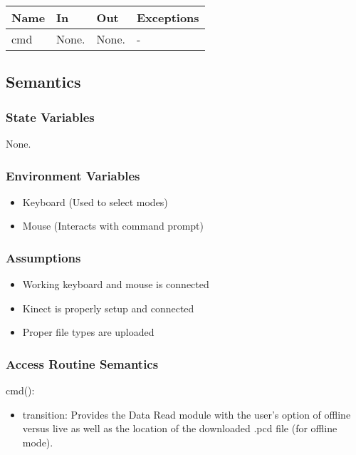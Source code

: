 \documentclass[12pt, titlepage]{article}
\begin{document}
\begin{center}
\begin{tabular}{p{2cm} p{4cm} p{4cm} p{2cm}}
\hline
\textbf{Name} & \textbf{In} & \textbf{Out} & \textbf{Exceptions} \\
\hline
cmd & None. & None. & - \\
\hline
\end{tabular}
\end{center}

\subsection{Semantics}

\subsubsection{State Variables}

None.

\subsubsection{Environment Variables}

\begin{itemize}
  \item Keyboard (Used to select modes)
  \item Mouse (Interacts with command prompt)
\end{itemize}

\subsubsection{Assumptions}

\begin{itemize}
  \item Working keyboard and mouse is connected
  \item Kinect is properly setup and connected
  \item Proper file types are uploaded
\end{itemize}

\subsubsection{Access Routine Semantics}

\noindent cmd():
\begin{itemize}
\item transition: Provides the Data Read module with the user's option of offline versus live as well as the location of the downloaded .pcd file (for offline mode).
\end{itemize}
\end{document}
